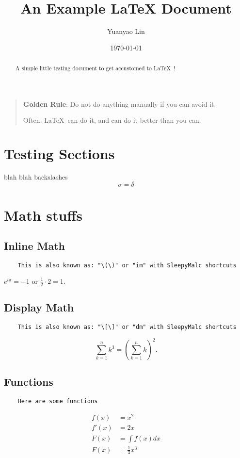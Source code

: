\documentclass[12pt]{article}
\theoremstyle{plain} %
\theoremstyle{definition}
\theoremstyle{remark}
\newcommand{\half}{\frac{1}{2}}
\begin{document}
\title{An Example LaTeX Document}
\author{Yuanyao Lin}
\date{\today}
\maketitle 

\begin{abstract}
    A simple little testing document to get accustomed to \LaTeX\ !
\end{abstract}

\tableofcontents

\eject

\begin{quote}
    \textbf{Golden Rule}: Do not do anything manually if you can avoid it.

    Often, \LaTeX\ can do it, and can do it better than you can.
\end{quote}

\section{Testing Sections}
blah blah backslashes 
\[
  \sigma = \delta
\]
\eject

\section{Math stuffs}
\subsection{Inline Math}
\begin{verbatim}
    This is also known as: "\(\)" or "im" with SleepyMalc shortcuts
\end{verbatim}

$e^{i \pi} = -1$ or $\half \cdot 2 = 1$.
\subsection{Display Math}
\begin{verbatim}
    This is also known as: "\[\]" or "dm" with SleepyMalc shortcuts
\end{verbatim}
\[
    \sum_{k=1}^n k^3 = \left( \sum_{k=1}^n k \right)^2.
\]

\subsection{Functions}
\begin{verbatim}
    Here are some functions
\end{verbatim}
\begin{align}
    f(x) &= x^2\\
    f'(x) &= 2x\\
    F(x) &= \int f(x)dx\\
    F(x) &= \frac{1}{3}x^3
    \end{align}

\eject
\end{document}
